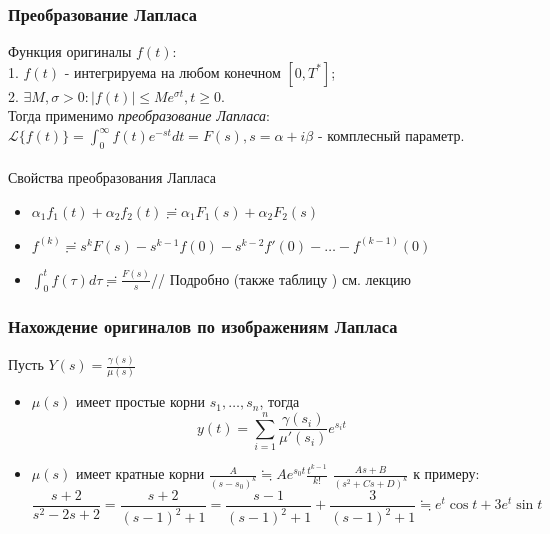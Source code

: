 \documentclass[A4]{article}
\begin{document}
\subsubsection{Преобразование Лапласа}
Функция оригиналы $f(t)$:\\
1. $f(t)$ - интегрируема на любом конечном $[0,T^*]$;\\
2. $\exists M,\sigma>0:|f(t)|\le Me^{\sigma t},t\ge 0$.\\
Тогда применимо \emph{преобразование Лапласа}:\\ $\mathcal{L}\{f(t)\}=\int_{0}^{\infty} f(t)e^{-st}dt=F(s),s=\alpha+i\beta$ - комплесный параметр.\\
\\
Свойства преобразования Лапласа
\begin{itemize}
	\item $\alpha_1f_1(t)+\alpha_2f_2(t)\risingdotseq\alpha_1F_1(s)+\alpha_2F_2(s)$
	\item $f^{(k)}\risingdotseq s^kF(s)-s^{k-1}f(0)-s^{k-2}f'(0)-\ldots-f^{(k-1)}(0)$
	\item $\int_{0}^{t} f(\tau) d\tau \risingdotseq\frac{F(s)}{s}$//
	Подробно (также таблицу ) см. лекцию
\end{itemize}
\subsubsection{Нахождение оригиналов по изображениям Лапласа}
Пусть $Y(s)=\frac{\gamma(s)}{\mu(s)}$
\begin{itemize}
	\item $\mu(s)$ имеет простые корни $s_1,\ldots,s_n$, тогда
	\begin{equation}
	y(t)=\sum_{i=1}^{n}\frac{\gamma(s_i)}{\mu'(s_i)}e^{s_i t}	
	\end{equation} 
	\item $\mu(s)$ имеет кратные корни
	\subitem $\frac{A}{(s-s_0)^k}\fallingdotseq Ae^{s_0t}\frac{t^{k-1}}{k!}$
	\subitem $\frac{As+B}{(s^2+Cs+D)^k}$ к примеру:
	\begin{equation}
	\frac{s+2}{s^2-2s+2}=\frac{s+2}{(s-1)^2+1}=\frac{s-1}{(s-1)^2+1}+\frac{3}{(s-1)^2+1}\fallingdotseq e^t\cos t+3e^t\sin t
	\end{equation}
\end{itemize}
\end{document}
